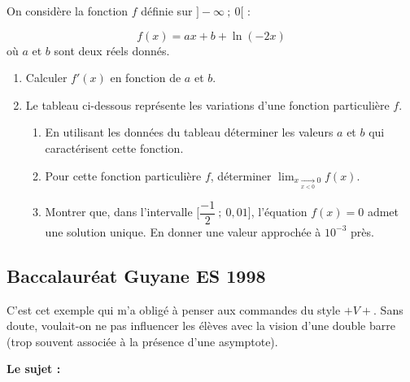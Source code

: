 \begin{tkzexample}
	On considère la fonction $f$ définie sur $]-\infty~;~0[$ :

	\[
	  f(x)=ax+b+\ln(-2x)
	\]
	où $a$ et $b$ sont deux réels donnés.

	\begin{enumerate}
	\item Calculer $f'(x)$ en fonction de $a$ et $b$.
	\item Le tableau ci-dessous représente les variations d'une fonction particulière $f$.

	\medskip
	\begin{center}
	\end{center}

	\medskip
	\begin{enumerate}
	\item En utilisant les données du tableau déterminer les valeurs $a$ et $b$ qui caractérisent
	 cette fonction.
	\item Pour cette fonction particulière $f$, déterminer 
	        $\displaystyle \lim_{x \xrightarrow[x<0]{} 0} f(x)$.
	\item Montrer que, dans l'intervalle $\Big[\dfrac{-1}{2}~;~0,01\Big]$, l'équation $f(x)=0$
	 admet une solution unique. En donner une valeur approchée à $10^{-3}$ près.
	\end{enumerate}
	\end{enumerate}
\end{tkzexample}



\subsection{Baccalauréat Guyane ES 1998 }
C'est cet exemple qui m'a obligé à penser aux   commandes du style $+V+$. Sans doute, voulait-on ne pas influencer les élèves avec la vision d'une double barre (trop souvent associée à la présence d'une asymptote).

\textbf{Le sujet :}

